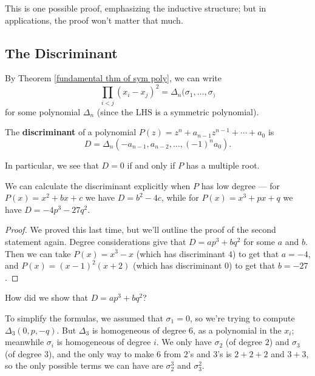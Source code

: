 This is one possible proof, emphasizing the inductive structure; but in applications, the proof won't matter that much. 

\subsection{The Discriminant}

By Theorem \ref{fundamental thm of sym poly}, we can write \[\prod_{i < j} (x_i - x_j)^2 = \Delta_n(\sigma_1, \ldots, \sigma_)\] for some polynomial $\Delta_n$ (since the LHS is a symmetric polynomial). 

\begin{definition}
The \textbf{discriminant} of a polynomial $P(z) = z^n + a_{n - 1}z^{n - 1} + \cdots + a_0$ is \[D = \Delta_n(-a_{n - 1}, a_{n - 2}, \ldots, (-1)^na_0).\] 
\end{definition}

In particular, we see that $D = 0$ if and only if  $P$ has a multiple root. 

\begin{example}
    We can calculate the discriminant explicitly when $P$ has low degree --- for $P(x) = x^2 + bx + c$ we have $D = b^2 - 4c$, while for $P(x) = x^3 + px + q$ we have $D = -4p^3 - 27q^2$.
\end{example}

\begin{proof}
    We proved this last time, but we'll outline the proof of the second statement again. Degree considerations give that $D = ap^3 + bq^2$ for some $a$ and $b$. Then we can take $P(x) = x^3 - x$ (which has discriminant $4$) to get that $a = -4$, and $P(x) = (x - 1)^2(x + 2)$ (which has discriminant $0$) to get that $b = -27$. 
\end{proof}

\begin{question}
    How did we show that $D = ap^3 + bq^2$?
\end{question}

\begin{ans}
    To simplify the formulas, we assumed that $\sigma_1 = 0$, so we're trying to compute $\Delta_3(0, p, -q)$. But $\Delta_3$ is homogeneous of degree $6$, as a polynomial in the $x_i$; meanwhile $\sigma_i$ is homogeneous of degree $i$. We only have $\sigma_2$ (of degree $2$) and $\sigma_3$ (of degree $3$), and the only way to make $6$ from $2$'s and $3$'s is $2 + 2 + 2$ and $3 + 3$, so the only possible terms we can have are $\sigma_2^3$ and $\sigma_3^2$. 
\end{ans}

